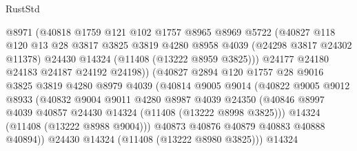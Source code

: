 \begin{lexlean}{RustStd}
\begin{coremodule}
                        @8971
                        (@40818
                          @1759
                          @121
                          @102
                          @1757
                          @8965
                          @8969
                          @5722
                          (@40827
                            @118
                            @120
                            @13
                            @28
                            @3817
                            @3825
                            @3819
                            @4280
                            @8958
                            @4039
                            (@24298 @3817 @24302 @11378)
                            @24430
                            @14324
                            (@11408 (@13222 @8959 @3825)))
                          @24177
                          @24180
                          @24183
                          @24187
                          @24192
                          @24198))
                      (@40827
                        @2894
                        @120
                        @1757
                        @28
                        @9016
                        @3825
                        @3819
                        @4280
                        @8979
                        @4039
                        (@40814
                          @9005
                          @9014
                          (@40822
                            @9005
                            @9012
                            @8933
                            (@40832
                              @9004
                              @9011
                              @4280
                              @8987
                              @4039
                              @24350
                              (@40846
                                @8997
                                @4039
                                @40857
                                @24430
                                @14324
                                (@11408 (@13222 @8998 @3825)))
                              @14324
                              (@11408 (@13222 @8988 @9004)))
                            @40873
                            @40876
                            @40879
                            @40883
                            @40888
                            @40894))
                        @24430
                        @14324
                        (@11408 (@13222 @8980 @3825)))
                      @14324

\end{coremodule}
\end{lexlean}
